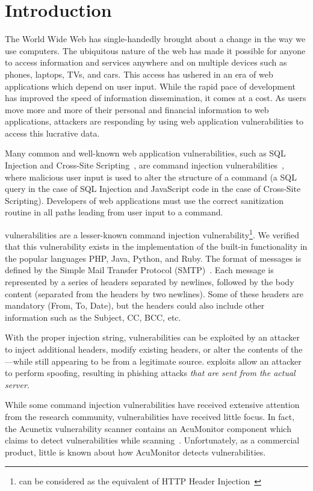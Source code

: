 \section{Introduction}
The World Wide Web has single-handedly brought about a change in the way we use computers. The ubiquitous nature of the web has made it possible for anyone to access information and services anywhere and on multiple devices such as phones, laptops, TVs, and cars. This access has ushered in an era of web applications which depend on user input. 
While the rapid pace of development has improved the speed of information dissemination, it comes at a cost. As users move more and more of their personal and financial information to web applications, attackers are responding by using web application vulnerabilities to access this lucrative data.

Many common and well-known web application vulnerabilities, such as SQL Injection and Cross-Site Scripting~\cite{OWASPT10}, are command injection vulnerabilities~\cite{commandinjection}, where malicious user input is used to alter the structure of a command (a SQL query in the case of SQL Injection and JavaScript code in the case of Cross-Site Scripting). Developers of web applications must use the correct sanitization routine in all paths leading from user input to a command. 

\ehi vulnerabilities are a lesser-known command injection vulnerability\footnote{\ehi can be considered as the \email equivalent of HTTP Header Injection~\cite{wiki:HTTP_headerinjection}}. We verified that this vulnerability exists in the implementation of the built-in \email functionality in the popular languages PHP, Java, Python, and Ruby. The format of \email messages is defined by the Simple Mail Transfer Protocol (SMTP)~\cite{rfc5322}. Each \email message is represented by a series of headers separated by newlines, followed by the body content (separated from the headers by two newlines). Some of these headers are mandatory (From, To, Date), but the headers could also include other information such as the Subject, CC, BCC, etc.

With the proper injection string, \ehi vulnerabilities can be exploited by an attacker to inject additional headers, modify existing headers, or alter the contents of the \email---while still appearing to be from a legitimate source. \ehi exploits allow an attacker to perform \email spoofing, resulting in phishing attacks \emph{that are sent from the actual \email server}.

While some command injection vulnerabilities have received extensive attention from the research community, \ehi vulnerabilities have received little focus. In fact, the Acunetix vulnerability scanner contains an AcuMonitor component which claims to detect \ehi vulnerabilities while scanning~\cite{acumonitor}. Unfortunately, as a commercial product, little is known about how AcuMonitor detects \ehi vulnerabilities. 

